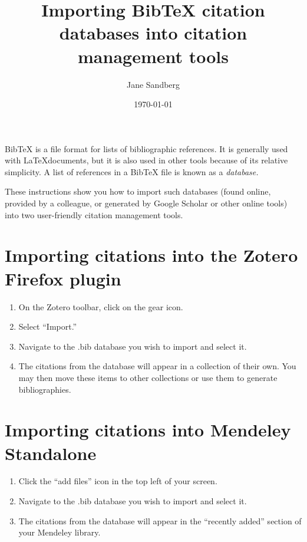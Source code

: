 \documentclass[11pt,a4paper]{article}
\title{Importing BibTeX citation databases into citation management tools}
\author{Jane Sandberg}
\date{\today}
\begin{document}
\maketitle

BibTeX is a file format for lists of bibliographic references.  It is generally used with \LaTeX documents, but it is also used in other tools because of its relative simplicity.  A list of references in a BibTeX file is known as a \emph{database.}

These instructions show you how to import such databases (found online, provided by a colleague, or generated by Google Scholar or other online tools) into two user-friendly citation management tools.

\section*{Importing citations into the Zotero Firefox plugin}
\begin{enumerate}
\item On the Zotero toolbar, click on the gear icon.
\item Select ``Import.''
\item Navigate to the .bib database you wish to import and select it.
\item The citations from the database will appear in a collection of their own.  You may then move these items to other collections or use them to generate bibliographies.
\end{enumerate}


\section*{Importing citations into Mendeley Standalone}
\begin{enumerate}
\item Click the ``add files'' icon in the top left of your screen.
\item Navigate to the .bib database you wish to import and select it.
\item The citations from the database will appear in the ``recently added'' section of your Mendeley library.
\end{enumerate}
\end{document}
